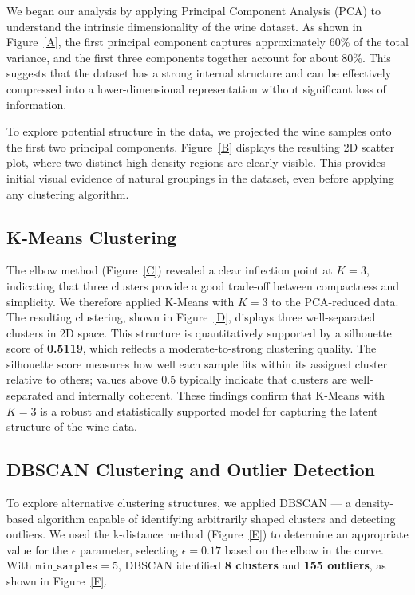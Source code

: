 \documentclass[12pt]{article}
\begin{document}
We began our analysis by applying Principal Component Analysis (PCA) to understand the intrinsic dimensionality of the wine dataset. 
As shown in Figure~\ref{A}, the first principal component captures approximately 60\% of the total variance, and the first three components together account for about 80\%. 
This suggests that the dataset has a strong internal structure and can be effectively compressed into a lower-dimensional representation without significant loss of information.

To explore potential structure in the data, we projected the wine samples onto the first two principal components. 
Figure~\ref{B} displays the resulting 2D scatter plot, where two distinct high-density regions are clearly visible.
This provides initial visual evidence of natural groupings in the dataset, even before applying any clustering algorithm.

\subsection*{K-Means Clustering}

The elbow method (Figure~\ref{C}) revealed a clear inflection point at $K=3$, indicating that three clusters provide a good trade-off between compactness and simplicity. 
We therefore applied K-Means with $K=3$ to the PCA-reduced data. 
The resulting clustering, shown in Figure~\ref{D}, displays three well-separated clusters in 2D space. 
This structure is quantitatively supported by a silhouette score of \textbf{0.5119}, which reflects a moderate-to-strong clustering quality. 
The silhouette score measures how well each sample fits within its assigned cluster relative to others; values above 0.5 typically indicate that clusters are well-separated and internally coherent. 
These findings confirm that K-Means with $K=3$ is a robust and statistically supported model for capturing the latent structure of the wine data.

\subsection*{DBSCAN Clustering and Outlier Detection}

To explore alternative clustering structures, we applied DBSCAN — a density-based algorithm capable of identifying arbitrarily shaped clusters and detecting outliers. 
We used the k-distance method (Figure~\ref{E}) to determine an appropriate value for the $\epsilon$ parameter, selecting $\epsilon = 0.17$ based on the elbow in the curve. 
With $\texttt{min\_samples} = 5$, DBSCAN identified \textbf{8 clusters} and \textbf{155 outliers}, as shown in Figure~\ref{F}.
\end{document}
